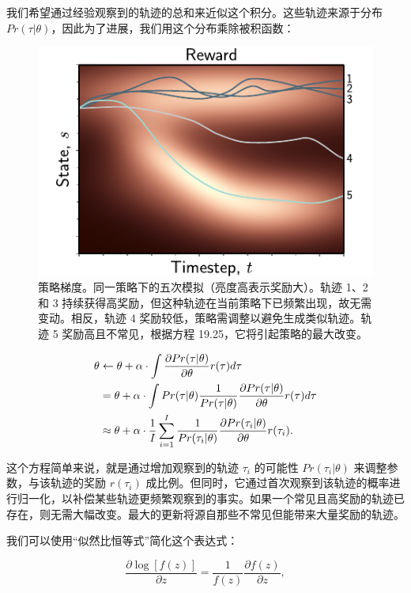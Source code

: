 \documentclass[lang=cn,newtx,10pt,scheme=chinese]{elegantbook}
\begin{document}
我们希望通过经验观察到的轨迹的总和来近似这个积分。这些轨迹来源于分布 \(Pr(\tau|\theta)\)，因此为了进展，我们用这个分布乘除被积函数：

\begin{figure}[ht!]
\centering
\includegraphics[width=0.7\linewidth]{PDFFigures/UDLChap19PDF/ReinforcePolicyGrad.pdf}
\caption{策略梯度。同一策略下的五次模拟（亮度高表示奖励大）。轨迹 1、2 和 3 持续获得高奖励，但这种轨迹在当前策略下已频繁出现，故无需变动。相反，轨迹 4 奖励较低，策略需调整以避免生成类似轨迹。轨迹 5 奖励高且不常见，根据方程 19.25，它将引起策略的最大改变。}
\end{figure}

\begin{align}
\theta &\leftarrow \theta + \alpha \cdot \int \frac{\partial Pr(\tau|\theta)}{\partial \theta} r(\tau) d\tau \notag\\
&= \theta + \alpha \cdot \int Pr(\tau|\theta) \frac{1}{Pr(\tau|\theta)} \frac{\partial Pr(\tau|\theta)}{\partial \theta} r(\tau) d\tau \notag\\
&\approx \theta + \alpha \cdot \frac{1}{I} \sum_{i=1}^I \frac{1}{Pr(\tau_i|\theta)} \frac{\partial Pr(\tau_i|\theta)}{\partial \theta} r(\tau_i). 
\end{align} 



这个方程简单来说，就是通过增加观察到的轨迹 \(\tau_i\) 的可能性 \(Pr(\tau_i|\theta)\) 来调整参数，与该轨迹的奖励 \(r(\tau_i)\) 成比例。但同时，它通过首次观察到该轨迹的概率进行归一化，以补偿某些轨迹更频繁观察到的事实。如果一个常见且高奖励的轨迹已存在，则无需大幅改变。最大的更新将源自那些不常见但能带来大量奖励的轨迹。

我们可以使用“似然比恒等式”简化这个表达式：

\begin{equation}
\frac{\partial \log[f(z)]}{\partial z} = \frac{1}{f(z)} \frac{\partial f(z)}{\partial z}, 
\end{equation}
\end{document}
